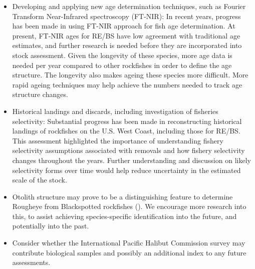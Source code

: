 \documentclass[
  english,
]{article}
\begin{document}
\begin{itemize}
  This will include the consideration of improving the ageing error of
  these species, with a consideration towards decreasing the number of
  ageing error matrices needed, or improving the imprecision of some of
  the current ageing error matrices. This would necessitate the
  re-reading of otoliths (in addition to reading new otoliths).
\item
  Developing and applying new age determination techniques, such as
  Fourier Transform Near-Infrared spectroscopy (FT-NIR): In recent
  years, progress has been made in using FT-NIR approach for fish age
  determination. At present, FT-NIR ages for RE/BS have low agreement
  with traditional age estimates, and further research is needed before
  they are incorporated into stock assessment. Given the longevity of
  these species, more age data is needed per year compared to other
  rockfishes in order to define the age structure. The longevity also
  makes ageing these species more difficult. More rapid ageing
  techniques may help achieve the numbers needed to track age structure
  changes.
\item
  Historical landings and discards, including investigation of fisheries
  selectivity: Substantial progress has been made in reconstructing
  historical landings of rockfishes on the U.S. West Coast, including
  those for RE/BS. This assessment highlighted the importance of
  understanding fishery selectivity assumptions associated with removals
  and how fishery selectivity changes throughout the years. Further
  understanding and discussion on likely selectivity forms over time
  would help reduce uncertainty in the estimated scale of the stock.
\item
  Otolith structure may prove to be a distinguishing feature to
  determine Rougheye from Blackspotted rockfishes
  (). We encourage
  more research into this, to assist achieving species-specific
  identification into the future, and potentially into the past.
\item
  Consider whether the International Pacific Halibut Commission survey
  may contribute biological samples and possibly an additional index to
  any future assessments.
\end{itemize}
\end{document}
